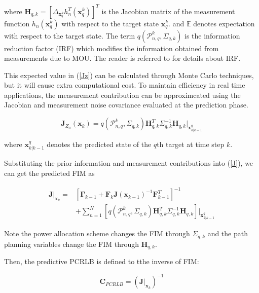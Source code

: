 \documentclass[12pt,journal,draftclsnofoot,onecolumn]{IEEEtran}
\begin{document}
where $\mathbf{H}_{q,k}=[\Delta_{\mathbf{x}_q^k}h_n^T(\mathbf{x}_q^k)]^T$ is the Jacobian matrix of the measurement function $h_n(\mathbf{x}_q^k)$ with respect to the target state $\mathbf{x}_q^k$. and $\mathbb{E}$ denotes expectation with respect to the target state. The term $q(\mathcal{P}_{n,q}^k,\Sigma_{q,k})$ is the information reduction factor (IRF)\cite{niu2001matrix} which modifies the information obtained from measurements due to MOU. The reader is referred to \cite{tharmarasa2007pcrlb,hernandez2004multisensor} for details about IRF.

This expected value in (\ref{Jz}) can be calculated through Monte Carlo techniques, but it will cause extra computational cost. To maintain efficiency in real time applications, the measurement contribution can be approximcated using the Jacobian and measurement noise covariance evaluated at the prediction phase.

\begin{equation}
	\mathbf{J}_{Z_{n}}(\mathbf{x}_k)=q(\mathcal{P}_{n,q}^k,\Sigma_{q,k})\mathbf{H}_{q,k}^T\Sigma_{q,k}^{-1}\mathbf{H}_{q,k}\bigg|_{\mathbf{x}_{k|k-1}^q}	
\end{equation}

where $\mathbf{x}_{k|k-1}^q$ denotes the predicted state of the $q$th target at time step $k$. 

Substituting the prior information and measurement contributions into (\ref{J}), we can get the predicted FIM as

\begin{equation}
	\begin{aligned}
	\mathbf{J}|_{\mathbf{x}_k}=&[\mathbf{\Gamma}_{k-1}+\mathbf{F}_k\mathbf{J}(\mathbf{x}_{k-1})^{-1}\mathbf{F}_{k-1}^T]^{-1}\\
	&+\sum_{n=1}^{N}[q(\mathcal{P}_{n,q}^k,\Sigma_{q,k})\mathbf{H}_{q,k}^T\Sigma_{q,k}^{-1}\mathbf{H}_{q,k}]\bigg|_{\mathbf{x}_{k|k-1}^q}
	\end{aligned}
    \label{eqn:predicted FIM}
\end{equation}

Note the power allocation scheme changes the FIM through $\Sigma_{q,k}$ and the path planning variables change the FIM through $\mathbf{H}_{q,k}$.

Then, the predictive PCRLB is defined to tthe inverse of FIM:

\begin{equation}
	\mathbf{C}_{PCRLB} = (\mathbf{J}|_{\mathbf{x}_k})^{-1}
\end{equation} 
\end{document}
